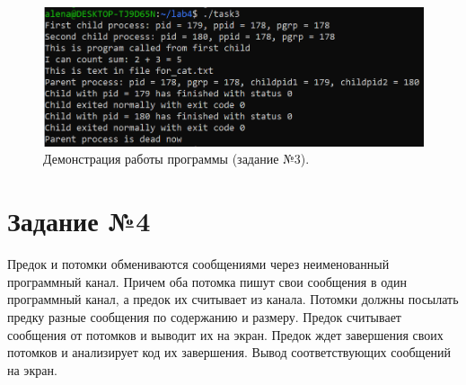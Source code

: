 \documentclass[12pt]{report}
\begin{document}
\begin{figure}[H]

	\centering

	\includegraphics[width=\linewidth]{img/task03.png}
	\caption{Демонстрация работы программы (задание №3).}

	\label{fig:task03}

\end{figure}

\section*{Задание №4}

Предок и потомки обмениваются сообщениями через неименованный программный канал. Причем оба потомка пишут свои сообщения в один программный канал, а предок их считывает из канала. Потомки должны посылать предку разные сообщения по содержанию и размеру. Предок считывает сообщения от потомков и выводит их на экран. Предок ждет завершения своих потомков и анализирует код их завершения. Вывод соответствующих сообщений на экран.
\end{document}
